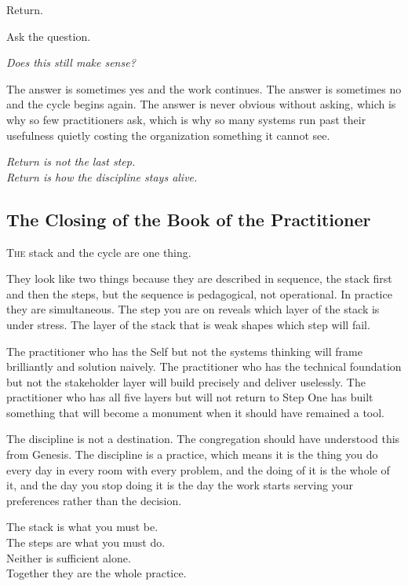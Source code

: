 Return.

Ask the question.

\textit{Does this still make sense?}

The answer is sometimes yes and the work continues. The answer is sometimes no and the cycle begins again. The answer is never obvious without asking, which is why so few practitioners ask, which is why so many systems run past their usefulness quietly costing the organization something it cannot see.

\begin{center}\small\itshape
  Return is not the last step.\\
  Return is how the discipline stays alive.
\end{center}


\vspace{2em}
\sermonrule

\subsection*{The Closing of the Book of the Practitioner}

\lettrine[lines=3, loversize=0.1, lraise=0.9]{T}{he} stack and the cycle are one thing.

They look like two things because they are described in sequence, the stack first and then the steps, but the sequence is pedagogical, not operational. In practice they are simultaneous. The step you are on reveals which layer of the stack is under stress. The layer of the stack that is weak shapes which step will fail.

The practitioner who has the Self but not the systems thinking will frame brilliantly and solution naively. The practitioner who has the technical foundation but not the stakeholder layer will build precisely and deliver uselessly. The practitioner who has all five layers but will not return to Step One has built something that will become a monument when it should have remained a tool.

The discipline is not a destination. The congregation should have understood this from Genesis. The discipline is a practice, which means it is the thing you do every day in every room with every problem, and the doing of it is the whole of it, and the day you stop doing it is the day the work starts serving your preferences rather than the decision.

\begin{closingverse}
  The stack is what you must be.\\
  The steps are what you must do.\\
  Neither is sufficient alone.\\[0.8em]
  \upshape Together they are the whole practice.
\end{closingverse}
